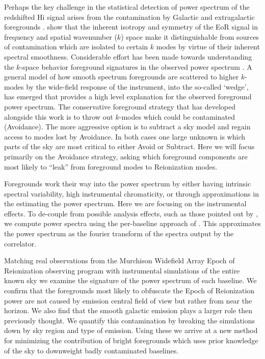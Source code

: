 \documentclass[preprint2,iop,numberedappendix]{emulateapj}
\begin{document}
Perhaps the key challenge in the statistical detection of power spectrum of the redshifted H{\sc i} signal arises from the contamination by Galactic and extragalactic foregrounds \citep[see, e.g.,][]{dim02,zal04,fur06}. \citet{mor04} show that the inherent isotropy and symmetry of the EoR signal in frequency and spatial wavenumber ($k$) space make it distinguishable from sources of contamination which are isolated to certain $k$ modes by virtue of their inherent spectral smoothness\citep{mor06,bow09,liu11,par12,dil13}.  Considerable effort has been made towards understanding the $k$-space behavior foreground signatures in the observed power spectrum \citep{thy13,pob13,mor12,tro12,dat10,bow09}.  A general model of how smooth spectrum foregrounds are scattered to higher $k$-modes by the wide-field response of the instrument, into the so-called `wedge',  has emerged that provides a high level explanation for the observed foreground power spectrum. The conservative foreground strategy that has developed alongside this work is to throw out $k$-modes which could be contaminated (Avoidance).  The more aggressive option is to subtract a sky model and regain access to modes lost by Avoidance. In both cases one large unknown is which parts of the sky are most critical to either Avoid or Subtract. Here we will focus primarily on the Avoidance strategy, asking which foreground components are most likely to ``leak'' from foreground modes to Reionization modes.

Foregrounds work their way into the power spectrum by either having intrinsic spectral variability, high instrumental chromaticity, or through approximations in the estimating the power spectrum. Here we are focusing on the instrumental effects. To de-couple from possible analysis effects, such as those pointed out by \citet{haz13}, we compute power spectra using the per-baseline approach of \citet{pob13,par14}.  This approximates the power spectrum as the fourier transform of the spectra output by the correlator. 



 Matching real observations from the Murchison Widefield Array Epoch of Reionization observing program with instrumental simulations of the entire known sky we examine the signature of the power spectrum of each baseline.  We confirm that the foregrounds most likely to obfuscate the Epoch of Reionization power are not caused by emission central field of view but rather from near the horizon. We also find that the smooth galactic emission plays a larger role then previously thought. We quantify this contamination by breaking the simulations down by sky region and type of emission. Using these we arrive at a new method for minimizing the contribution of bright foregrounds which uses prior knowledge of the sky to downweight badly contaminated baselines.
\end{document}
